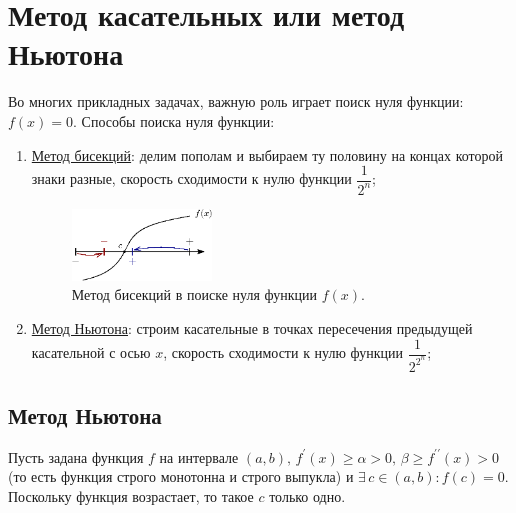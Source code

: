 \documentclass[12pt]{article}
\theoremstyle{definition}
\begin{document}
\section*{Метод касательных или метод Ньютона}
Во многих прикладных задачах, важную роль играет поиск нуля функции: $f(x) = 0$. Способы поиска нуля функции:
\begin{enumerate}[label={\arabic*)}]
	\item \uline{Метод бисекций}: делим пополам и выбираем ту половину на концах которой знаки разные, скорость сходимости к нулю функции $\dfrac{1}{2^n}$;
	\begin{figure}[H]
		\centering
		\includegraphics[width=0.35\textwidth]{28_3.eps}
		\caption{Метод бисекций в поиске нуля функции $f(x)$.}
		\label{28_3}
	\end{figure}
	\item \uline{Метод Ньютона}: строим касательные в точках пересечения предыдущей касательной с осью $x$, скорость сходимости к нулю функции $\dfrac{1}{2^{2^n}}$;
\end{enumerate}
\subsection*{Метод Ньютона}
Пусть задана функция $f$ на интервале $(a,b), \, f^\prime(x) \geq \alpha > 0, \, \beta \geq f^{\prime\prime}(x) > 0$ (то есть функция строго монотонна и строго выпукла) и $\exists \, c \in (a,b) \colon f(c) = 0$. Поскольку функция возрастает, то такое $c$ только одно. 
\end{document}
